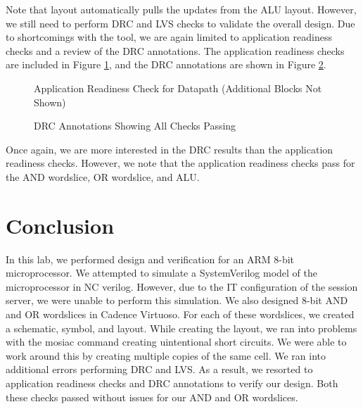 \documentclass{article}
\begin{document}
	\noindent Note that layout automatically pulls the updates from the ALU layout. However, we still need to perform DRC and LVS checks to validate the overall design. Due to shortcomings with the tool, we are again limited to application readiness checks and a review of the DRC annotations. The application readiness checks are included in Figure \ref{fig::datapath_application_readiness_check}, and the DRC annotations are shown in Figure \ref{fig::datapath_drc}.
	
	\begin{figure}[H]
		\centerline{}
		\caption{Application Readiness Check for Datapath (Additional Blocks Not Shown)}
		\label{fig::datapath_application_readiness_check}
	\end{figure}
	
	\begin{figure}[H]
		\centerline{}
		\caption{DRC Annotations Showing All Checks Passing}
		\label{fig::datapath_drc}
	\end{figure}
	
	\noindent Once again, we are more interested in the DRC results than the application readiness checks. However, we note that the application readiness checks pass for the AND wordslice, OR wordslice, and ALU.
	
	\section{Conclusion}
	
	In this lab, we performed design and verification for an ARM 8-bit microprocessor. We attempted to simulate a SystemVerilog model of the microprocessor in NC verilog. However, due to the IT configuration of the session server, we were unable to perform this simulation. We also designed 8-bit AND and OR wordslices in Cadence Virtuoso. For each of these wordslices, we created a schematic, symbol, and layout. While creating the layout, we ran into problems with the mosiac command creating uintentional short circuits. We were able to work around this by creating multiple copies of the same cell. We ran into additional errors performing DRC and LVS. As a result, we resorted to application readiness checks and DRC annotations to verify our design. Both these checks passed without issues for our AND and OR wordslices. 
	
\end{document}
